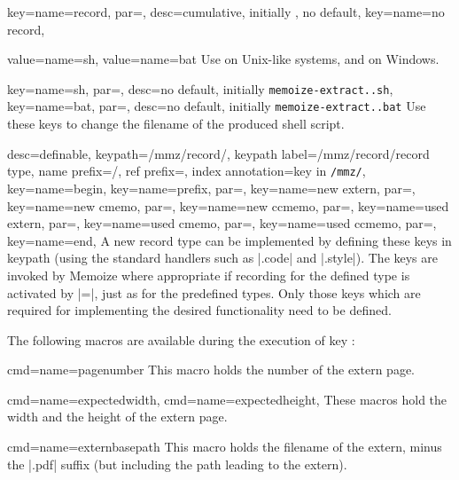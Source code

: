 \documentclass[a4paper,11pt]{article}
\begin{document}
\begin{doc}{
    key={name=record, par=,
      desc={cumulative, initially , no default}},
    key={name=no record},
  }
\begin{doc}{value={name=sh}, value={name=bat}}
    Use  on Unix-like systems, and  on
    Windows.
    
    \begin{doc}{
        key={name=sh, par=, desc={no default,
            initially \texttt{memoize-extract.\string\jobname.sh}}},
        key={name=bat, par=, desc={no default,
            initially \texttt{memoize-extract.\string\jobname.bat}}}
      }
      Use these keys to change the filename of the produced shell script.
    \end{doc}
  \end{doc}
\end{doc}

\begin{doc}{
    desc=definable,
    keypath=/mmz/record/,
    keypath label=/mmz/record/record type,
    name prefix={/}, ref prefix=,
    index annotation={key in \texttt{/mmz/}},
    key={name=begin},
    key={name=prefix, par=},
    key={name=new extern, par=},
    key={name=new cmemo, par=},
    key={name=new ccmemo, par=},
    key={name=used extern, par=},
    key={name=used cmemo, par=},
    key={name=used ccmemo, par=},
    key={name=end},
  }
  A new record type can be implemented by defining these keys in keypath
   (using the standard  handlers such as |.code| and
  |.style|).  The keys are invoked by Memoize where appropriate if recording
  for the defined type is activated by |=|,
  just as for the predefined types.  Only those keys which are required for
  implementing the desired functionality need to be defined.

  The following macros are available during the execution of key
  :
  \begin{doc}{cmd={name=pagenumber}}
    This macro holds the number of the extern page.
  \end{doc}
  \begin{doc}{
      cmd={name=expectedwidth},
      cmd={name=expectedheight},
    }
    These macros hold the width and the height of the extern page.
  \end{doc}
  \begin{doc}{cmd={name=externbasepath}}
    This macro holds the filename of the extern, minus the |.pdf| suffix (but
    including the path leading to the extern).
  \end{doc}
\end{doc}
\end{document}
